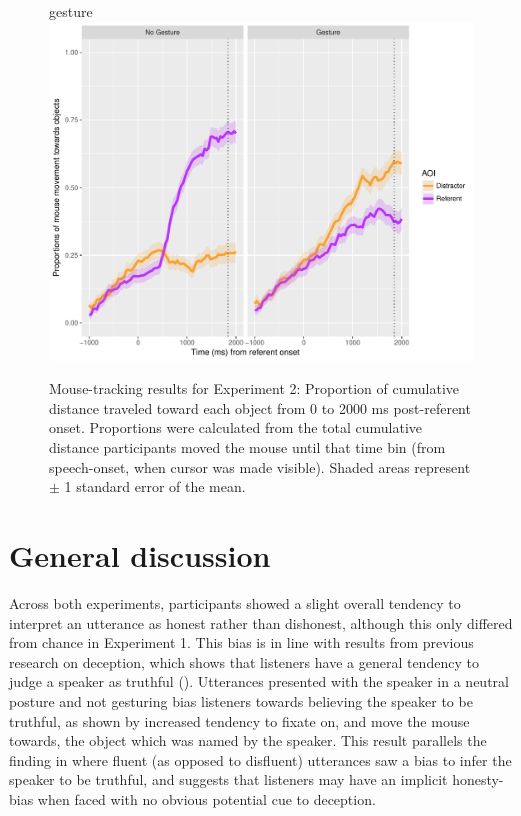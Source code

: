 \documentclass[a4paper,man,natbib]{apa6}
\begin{document}
\begin{figure}[Ht]gesture
  \centering
	\includegraphics[width=\linewidth]{./img/e8_mouset.pdf}
  \caption{Mouse-tracking results for Experiment 2: Proportion of cumulative distance traveled toward each object from 0 to 2000 ms post-referent onset. Proportions were calculated from the total cumulative distance participants moved the mouse until that time bin (from speech-onset, when cursor was made visible). Shaded areas represent $\pm$ 1 standard error of the mean.}
  \label{fig:v2_mouse}
\end{figure}

\section{General discussion}
Across both experiments, participants showed a slight overall tendency to interpret an utterance as honest rather than dishonest, although this only differed from chance in Experiment 1. 
This bias is in line with results from previous research on deception, which shows that listeners have a general tendency to judge a speaker as truthful (\citealt{Vrij2000}). 
Utterances presented with the speaker in a neutral posture and not gesturing bias listeners towards believing the speaker to be truthful, as shown by increased tendency to fixate on, and move the mouse towards, the object which was named by the speaker. 
This result parallels the finding in \citet{Loy2017} where fluent (as opposed to disfluent) utterances saw a bias to infer the speaker to be truthful, and suggests that listeners may have an implicit honesty-bias when faced with no obvious potential cue to deception. 
\end{document}
